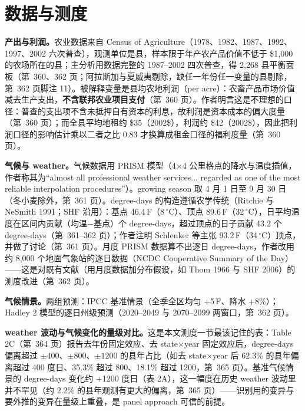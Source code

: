 \section{数据与测度}

\textbf{产出与利润。}农业数据来自 Census of Agriculture（1978、1982、1987、1992、1997、2002 六次普查），观测单位是县，样本限于年产农产品价值不低于 \$1{,}000 的农场所在的县；主分析用数据完整的 1987--2002 四次普查，得 2{,}268 县平衡面板（第~360、362 页；阿拉斯加与夏威夷剔除，缺任一年份任一变量的县剔除，第~362 页脚注 11）。被解释变量是县均农地利润（per acre）：农畜产品市场价值减去生产支出，\textbf{不含联邦农业项目支付}（第~360 页）。作者明言这是不理想的口径：普查的支出项不含未抵押自有资本的利息，故利润是资本成本的偏大度量（第~360 页）；而全县平均地租约 \$35（2002\$），利润约 \$42（2002\$），因此把利润口径的影响估计乘以二者之比 0.83 才换算成租金口径的福利度量（第~360 页）。

\textbf{气候与 weather。}气候数据用 PRISM 模型（4$\times$4 公里格点的降水与温度插值，作者称其为``almost all professional weather services... regarded as one of the most reliable interpolation procedures''\citep[第~361 页]{deschenes2007economic}）。growing season 取 4 月 1 日至 9 月 30 日（冬小麦除外，第~361 页）。degree-days 的构造遵循农学传统（Ritchie 与 NeSmith 1991；SHF 沿用）：基点 46.4\,F（8\,$^\circ$C）、顶点 89.6\,F（32\,$^\circ$C），日平均温度在区间内贡献（均温$-$基点）个 degree-days，超过顶点的日子贡献 43.2 个 degree-days（第~361--362 页）；作者注明 Schlenker 等主张 93.2\,F（34\,$^\circ$C）顶点，并做了讨论（第~361 页）。月度 PRISM 数据算不出逐日 degree-days，作者改用约 8{,}000 个地面气象站的逐日数据（NCDC Cooperative Summary of the Day）——这是对既有文献（用月度数据加分布假设，如 Thom 1966 与 SHF 2006）的测度改进（第~362 页）。

\textbf{气候情景。}两组预测：IPCC 基准情景（全季全区均匀 +5\,F、降水 +8\%）；Hadley 2 模型的逐日州级预测（2020--2049 与 2070--2099 两窗口，第~362 页）。

\textbf{weather 波动与气候变化的量级对比。}这是本文测度一节最该记住的表：Table 2C（第~364 页）报告去年份固定效应、去 state$\times$year 固定效应后，degree-days 偏离超过 $\pm400$、$\pm800$、$\pm1200$ 的县年占比（如去 state$\times$year 后 62.3\% 的县年偏离超过 400 度日、35.3\% 超过 800、18.1\% 超过 1200，第~365 页）。基准气候情景的 degree-days 变化约 +1200 度日（表 2A），这一幅度在历史 weather 波动里并不罕见（约 2.2\% 的县年观测有更大的偏离，第~365 页）——识别用的变异与要外推的变异在量级上重叠，是 panel approach 可信的前提。

